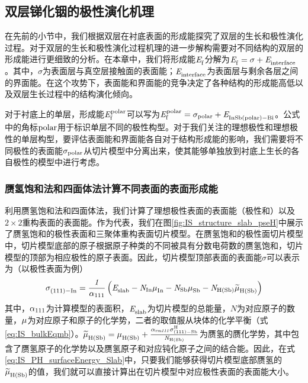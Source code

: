 \subsection{双层锑化铟的极性演化机理}

在先前的小节中，我们根据双层在衬底表面的形成能探究了双层的生长和极性演化过程。对于双层的生长和极性演化过程机理的进一步解构需要对不同结构的双层的形成能进行更细致的分析。在本章中，我们将形成能$\it E_{\rm f}^{\rm } \it$分解为$\it E_{\rm f}^{\rm } \it=\sigma + \it E_{\rm interface}^{\rm } \it$。其中，$\sigma$为表面层与真空层接触面的表面能；$\it E_{\rm interface}^{\rm } \it$为表面层与剩余各层之间的界面能。在这个攻势下，表面能和界面能的竞争决定了各种结构的形成能高低以及双层生长过程中的结构演化倾向。

对于衬底上的单层，形成能$\it E_{\rm f}^{\rm polar} \it$可以写为$\it E_{\rm f}^{\rm polar} \it=\sigma_{\rm polar} + \it E_{\rm InSb\left(polar\right)-Bi}^{\rm } \it$。公式中的角标$\rm polar$用于标识单层不同的极性构型。对于我们关注的理想极性和理想极性的单层构型，要评估表面能和界面能各自对于结构形成能的影响，我们需要将不同极性的表面能$\sigma_{\rm polar}$从切片模型中分离出来，使其能够单独放到衬底上生长的各自极性的模型中进行考虑。

\subsubsection{赝氢饱和法和四面体法计算不同表面的表面形成能}
利用赝氢饱和法和四面体法，我们计算了理想极性表面的表面能（极性和）以及$2 \times 2$重构表面的表面能。作为代表，我们在图\ref{fig:IS_structure_slab_pseH}中展示了赝氢饱和的极性表面和三聚体重构表面切片模型。在赝氢饱和的极性面切片模型中，切片模型底部的原子根据原子种类的不同被具有分数电荷数的赝氢饱和，切片模型的顶部为相应极性的原子表面。因此，切片模型顶部表面的表面能$\sigma$可以表示为（以极性表面为例）\chinesecolon
\begin{equation}
    \label{eq:IS_PH_surfaceEnergy_Slab}
    \it \sigma_{\rm \left(111\right)-In}^{\rm } \it
    =\frac{1}{\alpha _{\rm 111}}\left(\it E_{\rm slab}^{\rm } \it-N_{\rm In}\it \mu_{\rm In}^{\rm } \it-N_{\rm Sb}\it \mu_{\rm Sb}^{\rm } \it-N_{\rm H\left(Sb\right)} \it \widetilde{\mu}_{\rm H\left(Sb\right)}^{\rm } \it \right)
\end{equation}
其中，$\alpha _{\rm 111}$为计算模型的表面积，$\it E_{\rm slab}^{\rm } \it$为切片模型的总能量，$N$为对应原子的数量，$\it \mu_{\rm }^{\rm } \it$为对应原子和原子的化学势，二者的取值服从块体的化学平衡（式\ref{eq:IS_bulkEqmb}）。$\it \widetilde{\mu}_{\rm H\left(Sb\right)}^{\rm } \it=\it \mu_{\rm H\left(Sb\right)}^{\rm } \it+\frac{\alpha _{rm 111}\sigma_{\rm \left(111\right)-Sb}^{\rm H}}{N_{\rm H\left(Sb\right)}}$为赝氢的赝化学势，其中包含了赝氢原子的化学势以及赝氢原子和对应钝化原子之间的结合能。因此，在式\ref{eq:IS_PH_surfaceEnergy_Slab}中，只要我们能够获得切片模型底部赝氢的$\it \widetilde{\mu}_{\rm H\left(Sb\right)}^{\rm } \it$的值，我们就可以直接计算出在切片模型中对应极性表面的表面能大小。

